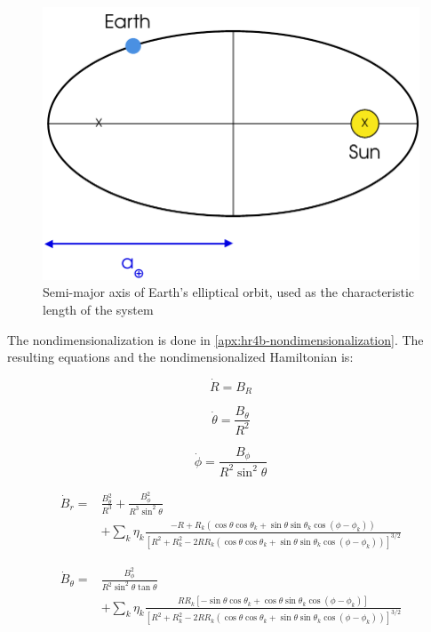 \begin{figure}[ht]
    \centering
    \includegraphics[width=0.60\linewidth]{fig/earth-semi-major-axis}
    \caption{Semi-major axis of Earth's elliptical orbit, used as the characteristic length of the system}
    \label{fig:earth-semi-major-axis}
\end{figure}

\clearpage

The nondimensionalization is done in \cref{apx:hr4b-nondimensionalization}. The resulting equations and the nondimensionalized Hamiltonian is:

\begin{equation} \tag{2.67}
    \boxed{
            \dot{R} = B_R
    }
\end{equation}


\begin{equation} \tag{2.72}
    \boxed{
            \dot{\theta} = \frac{B_\theta}{R^2}
    }
\end{equation}


\begin{equation} \tag{2.76}
    \boxed{
            \dot{\phi} = \frac{B_\phi}{R^2 \sin^2{\theta}}
    }
\end{equation}


\begin{equation} \tag{2.86}
    \boxed{
        \!\begin{aligned}
            \dot{B}_r = &\frac{B_\theta^2}{R^3} + \frac{B_\phi^2}{R^3 \sin^2{\theta}} \\
            & + \sum\limits_{k} \eta_k \frac{-R + R_k \left(\cos{\theta}\cos{\theta_k} + \sin{\theta}\sin{\theta_k}\cos{(\phi - \phi_k)}\right)}{\left[R^2 + R_k^2 - 2 R R_k \left(\cos{\theta}\cos{\theta_k} + \sin{\theta}\sin{\theta_k}\cos{(\phi - \phi_k)} \right) \right]^{3/2}}
        \end{aligned}
    }
\end{equation}


\begin{equation} \tag{2.87}
    \boxed{
        \!\begin{aligned}
            \dot{B}_\theta = &\frac{B_\phi^2}{R^2 \sin^2{\theta} \tan{\theta}} \\
            &+ \sum\limits_{k} \eta_k \frac{R R_k \left[-\sin{\theta}\cos{\theta_k} + \cos{\theta}\sin{\theta_k}\cos{(\phi - \phi_k)} \right]}{\left[R^2 + R_k^2 - 2 R R_k \left(\cos{\theta}\cos{\theta_k} + \sin{\theta}\sin{\theta_k}\cos{(\phi - \phi_k)} \right) \right]^{3/2}}
        \end{aligned}
    }
\end{equation}


